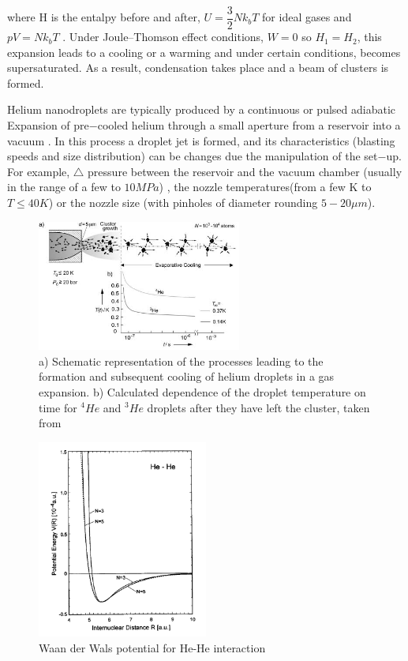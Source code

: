where H is the entalpy before and after, $U=\dfrac{3}{2}Nk_{b}T$ for ideal gases and $pV=Nk_{b}T$ \cite{enss_low-temperature_2005}. Under Joule–Thomson effect conditions, $W=0$ so $H_{1}=H_{2}$, this expansion leads to a cooling or a warming and under certain conditions, becomes supersaturated. As a result, condensation takes place and a beam of clusters is formed.

Helium nanodroplets are typically produced by a continuous or pulsed adiabatic Expansion of pre$-$cooled helium through a small aperture from a reservoir into a vacuum  \cite{stienkemeier_spectroscopy_2006}. In this process a droplet jet is formed, and its characteristics (blasting speeds and size distribution) can be changes due the manipulation of the set$-$up. For example, $\bigtriangleup$ pressure between the reservoir and the vacuum chamber (usually in the range of a few to $10MPa$) , the nozzle temperatures(from a few K to $T \leqslant 40K$) or the nozzle size (with pinholes of diameter rounding  $5-20 \mu m$).


\begin{figure}[h!]
\centering
	\includegraphics[width=0.6\textwidth]{../Images/jet_scketch.png}
	\caption[Scheme for a nozzle expansion]{ a) Schematic representation of the processes leading to the formation and subsequent cooling of helium droplets in a gas expansion. b) Calculated dependence of the droplet temperature on time for $^{4}He$ and $^{3}He$ droplets after they have left the cluster, taken from \cite{toennies_superfluid_2004}	}
	\label{img:jet}	
\end{figure}

\begin{figure}[h!]
\centering
	\includegraphics[width=0.5\textwidth]{../Images/waanderwaal_hehe.PNG}
	\caption[Waan der Wall He-He potential]{ Waan der Wals potential for He-He interaction}
	\label{img:WanderHe}
\end{figure}


